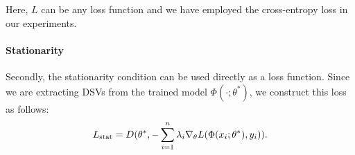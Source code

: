 Here, $L$ can be any loss function %
and we have employed the cross-entropy loss in our experiments.

\paragraph{Stationarity}
Secondly, the stationarity condition can be used directly as a loss function. Since we are extracting DSVs from the trained model $\Phi(\cdot ; \theta^*)$, %
we construct this loss as follows:
%
\begin{equation}\label{eq:stationarity}
\textcolor{black}{L_{\text{stat}} = D(\theta^*, -\sum_{i=1}^n \lambda_i \nabla_\theta L(\Phi(x_i;\theta^*), y_i))}.
\end{equation}
%
%
%
%
%
%
%
